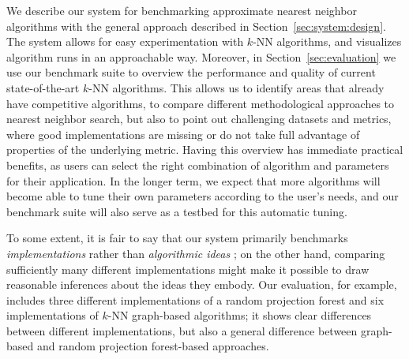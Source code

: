 We describe our system for benchmarking approximate nearest neighbor algorithms with the general approach 
described in Section~\ref{sec:system:design}. The system allows for easy experimentation with $k$-NN algorithms, 
and visualizes algorithm runs in an approachable way. Moreover, in Section~\ref{sec:evaluation} we use our benchmark suite to overview the performance and quality of current state-of-the-art $k$-NN algorithms. This allows us to identify areas that already have competitive algorithms, to compare different methodological approaches to nearest neighbor search, but also to point out challenging datasets and metrics, where good implementations are missing or do not take full advantage of properties of the underlying metric. 
Having this overview has immediate practical benefits, as users can select the right combination of algorithm and parameters for their application. In the longer term, we expect that more algorithms will become able to tune their own parameters according to the user's needs, and our benchmark suite will also serve as a testbed for this automatic tuning.

\medskip

To some extent, it is fair to say that our system primarily
benchmarks \emph{implementations} rather than \emph{algorithmic
ideas} \cite{KriegelSZ17};
on the other hand, comparing sufficiently many different implementations
might make it possible to draw reasonable inferences about the ideas they
embody. Our evaluation, for example, includes three different implementations
of a random projection forest and six implementations of $k$-NN graph-based
algorithms; it shows clear differences between different implementations,
but also a general difference between graph-based and random projection
forest-based approaches. 
